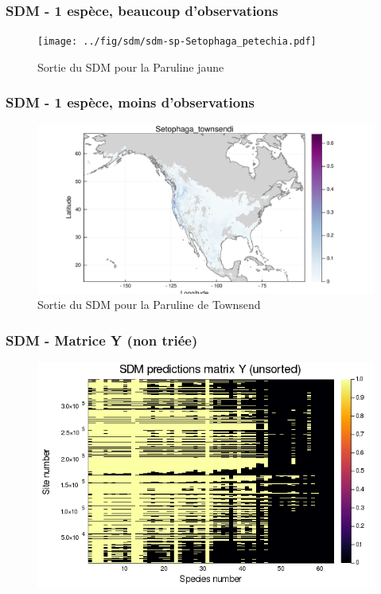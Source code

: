 \documentclass[10pt]{beamer}
\begin{document}
\begin{frame}
  \frametitle{SDM - 1 espèce, beaucoup d'observations}
  \begin{figure}
    \centering
    \hspace*{-2cm}\texttt{[image: ../fig/sdm/sdm-sp-Setophaga\_petechia.pdf]}
    \caption{Sortie du SDM pour la Paruline jaune}
  \end{figure}
\end{frame}

\begin{frame}
  \frametitle{SDM - 1 espèce, moins d'observations}
  \begin{figure}
    \centering
    \hspace*{-2cm}\includegraphics[scale=0.5]{../fig/sdm/sdm-sp-Setophaga_townsendi.pdf}
    \caption{Sortie du SDM pour la Paruline de Townsend}
  \end{figure}
\end{frame}

\begin{frame}
  \frametitle{SDM - Matrice Y (non triée)}
  \begin{figure}
    \centering
    \includegraphics[scale=0.4]{../fig/sdm/sdm-Y-unsorted.png}
  \end{figure}
\end{frame}
\end{document}
